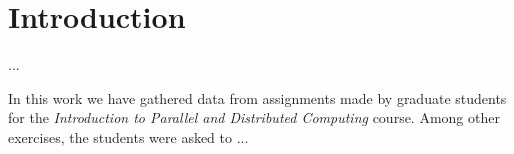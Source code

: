 \section{Introduction}
\label{sec:introduction}


...

In this work we have gathered data from assignments made by graduate students
for the \emph{Introduction to Parallel and Distributed Computing} course. Among
other exercises, the students were asked to ...

